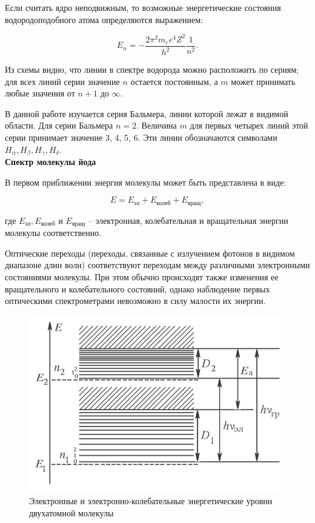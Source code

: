 \documentclass[a4paper, 12pt]{article}%
\begin{document}
Если считать ядро неподвижным,  то возможные энергетические состояния водородоподобного атома определяются выражением:

\[E_n = - \frac{2 \pi^2 m_e e^4 Z^2}{h^2} \frac{1}{n^2}.\]

	Из схемы видно,  что линии в спектре водорода можно расположить по сериям; для всех линий серии значение $n$ остается постоянным,  а $m$ может принимать любые значения от $n+1$ до $\infty$.

В данной работе изучается серия Бальмера,  линии которой лежат в видимой области.  Для серии Бальмера $n = 2$.  Величина $m$ для первых четырех линий этой серии принимает значение 3,  4,  5,  6.  Эти линии обозначаются символами $H_{\alpha},  H_{\beta},  H_{\gamma},  H_{\delta}$.\\

\textbf{Спектр молекулы йода}

В первом приближении энергия молекулы может быть представлена в виде:

\[E = E_{\text{эл}} + E_{\text{колеб}} + E_{\text{вращ}},\]

	где $E_{\text{эл}},  E_{\text{колеб}}$ и $E_{\text{вращ}}$ -- электронная, колебательная и вращательная энергии молекулы соответственно.

	Оптические переходы (переходы, связанные с излучением фотонов в видимом диапазоне длин волн) соответствуют переходам между различными электронными состояниями молекулы.  При этом обычно происходят также изменения ее вращательного и колебательного состояний,  однако наблюдение первых оптическими спектрометрами невозможно в силу малости их энергии.

	\begin{figure}[h!]
		\centering
		\includegraphics[scale=0.4]{Схема_2.PNG}
		 \caption{Электронные и электронно-колебательные энергетические уровни двухатомной молекулы}
	\end{figure}
\end{document}
